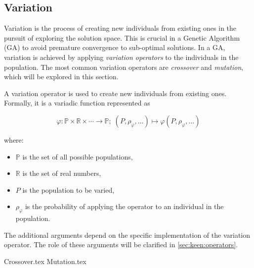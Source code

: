
\subsection{Variation}
\label{sec:genetic_algorithms:variation}
  Variation is the process of creating new individuals from existing ones in 
  the pursuit of exploring the solution space.
  This is crucial in a Genetic Algorithm (GA) to avoid premature convergence to 
  sub-optimal solutions.
  In a GA, variation is achieved by applying \emph{variation operators} to the 
  individuals in the population.
  The most common variation operators are \emph{crossover} and \emph{mutation}, 
  which will be explored in this section.

  \begin{definition}
    \label{def:variation_operator}
    A variation operator is used to create new individuals from existing ones.
    Formally, it is a variadic function represented as 
    
    \[
      \varphi : \mathbb{P} \times \mathbb{R} \times \cdots \to \mathbb{P};\; 
      (P, \rho_\varphi, \dots) \mapsto \varphi(P, \rho_\varphi, \dots)
    \]
    
    where:

    \begin{itemize}
      \item \(\mathbb{P}\) is the set of all possible populations,
      \item \(\mathbb{R}\) is the set of real numbers,
      \item \(P\) is the population to be varied,
      \item \(\rho_\varphi\) is the probability of applying the operator to an 
        individual in the population.
    \end{itemize}

    The additional arguments depend on the specific implementation of the 
    variation operator.
    The role of these arguments will be clarified in \vref{sec:keen:operators}.
  \end{definition}

  {Crossover.tex}
  {Mutation.tex}
